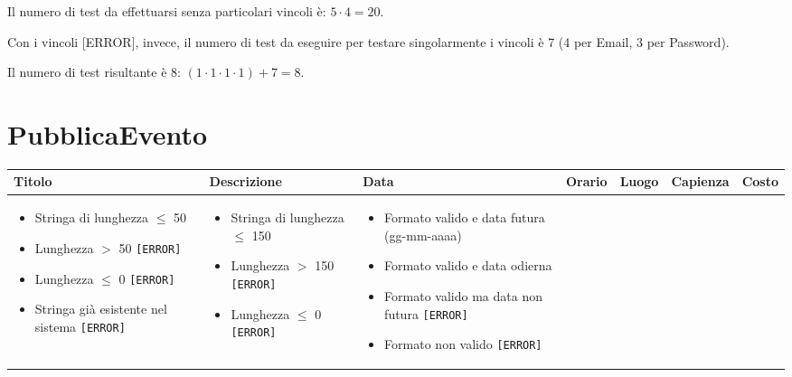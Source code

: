 \noindent Il numero di test da effettuarsi senza particolari vincoli è: $5 \cdot 4 = 20$.

\noindent Con i vincoli [ERROR], invece, il numero di test da eseguire per testare singolarmente i vincoli è 7 (4 per Email, 3 per Password).

\noindent Il numero di test risultante è 8: $(1 \cdot 1 \cdot 1 \cdot 1) + 7 = 8$.


\section{PubblicaEvento}
\begin{table}[H]
	\centering
	\footnotesize
	\renewcommand{\arraystretch}{1.3}
	\begin{tabularx}{\textwidth}{|X|X|X|X|X|X|X|}
		\hline
		\textbf{Titolo} & \textbf{Descrizione} & \textbf{Data} & \textbf{Orario} & \textbf{Luogo} & \textbf{Capienza} & \textbf{Costo} \\
		\hline

		\parbox[t]{\linewidth}{\begin{itemize}[leftmargin=*]
			\item Stringa di lunghezza $\leq$ 50 \checkmark
			\item Lunghezza $>$ 50 \texttt{[ERROR]}
			\item Lunghezza $\leq$ 0 \texttt{[ERROR]}
			\item Stringa già esistente nel sistema \texttt{[ERROR]}
		\end{itemize}} &

		\parbox[t]{\linewidth}{\begin{itemize}[leftmargin=*]
			\item Stringa di lunghezza $\leq$ 150 \checkmark
			\item Lunghezza $>$ 150 \texttt{[ERROR]}
			\item Lunghezza $\leq$ 0 \texttt{[ERROR]}
		\end{itemize}} &

		\parbox[t]{\linewidth}{\begin{itemize}[leftmargin=*]
			\item Formato valido e data futura (gg-mm-aaaa) \checkmark
			\item Formato valido e data odierna \checkmark
			\item Formato valido ma data non futura \texttt{[ERROR]}
			\item Formato non valido \texttt{[ERROR]}
		\end{itemize}} &


\end{tabularx}
\end{table}
